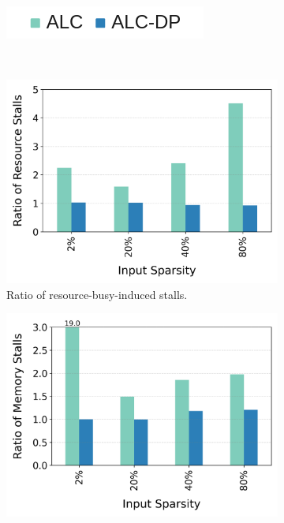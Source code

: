 \begin{figure}[h!]
  \centering
 \begin{subfigure}{4cm}
    \centering
    \includegraphics[width=\textwidth]{Figures/Evaluations/Legend.png}
 \end{subfigure}\\
  \begin{subfigure}{.5\textwidth}
    \centering
    \includegraphics[width=\textwidth, height=.28\textheight]{Figures/Evaluations/single_if_many_scatter_resource_stalls.png}
    \caption{Ratio of resource-busy-induced stalls.}
    \label{fig:single-if-many-scatter-resource-stalls}
  \end{subfigure}%
  \begin{subfigure}{.5\textwidth}
        \centering
    \includegraphics[width=\textwidth, height=.28\textheight]{Figures/Evaluations/single_if_many_scatter_mem_stalls.png}

\end{subfigure}
\end{figure}
